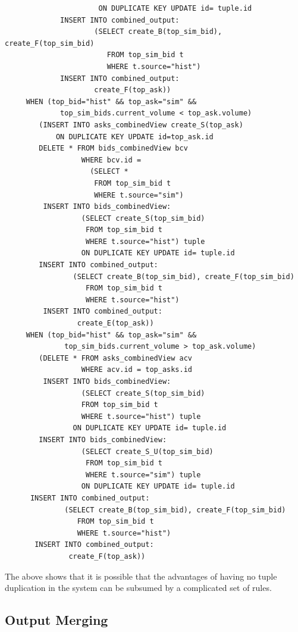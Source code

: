 \documentclass{article}
\begin{document}
\begin{verbatim}
                      ON DUPLICATE KEY UPDATE id= tuple.id
             INSERT INTO combined_output:
                     (SELECT create_B(top_sim_bid), create_F(top_sim_bid)
                        FROM top_sim_bid t
                        WHERE t.source="hist")
             INSERT INTO combined_output:
                     create_F(top_ask))
     WHEN (top_bid="hist" && top_ask="sim" &&
             top_sim_bids.current_volume < top_ask.volume)
        (INSERT INTO asks_combinedView create_S(top_ask)
            ON DUPLICATE KEY UPDATE id=top_ask.id
        DELETE * FROM bids_combinedView bcv
                  WHERE bcv.id = 
                    (SELECT *
                     FROM top_sim_bid t
                     WHERE t.source="sim")
         INSERT INTO bids_combinedView: 
                  (SELECT create_S(top_sim_bid)
                   FROM top_sim_bid t
                   WHERE t.source="hist") tuple
                  ON DUPLICATE KEY UPDATE id= tuple.id
        INSERT INTO combined_output:
                (SELECT create_B(top_sim_bid), create_F(top_sim_bid)
                   FROM top_sim_bid t
                   WHERE t.source="hist")
         INSERT INTO combined_output:
                 create_E(top_ask))
     WHEN (top_bid="hist" && top_ask="sim" &&
              top_sim_bids.current_volume > top_ask.volume)              
        (DELETE * FROM asks_combinedView acv
                  WHERE acv.id = top_asks.id
         INSERT INTO bids_combinedView: 
                  (SELECT create_S(top_sim_bid)
                  FROM top_sim_bid t
                  WHERE t.source="hist") tuple
                ON DUPLICATE KEY UPDATE id= tuple.id
        INSERT INTO bids_combinedView: 
                  (SELECT create_S_U(top_sim_bid)
                   FROM top_sim_bid t
                   WHERE t.source="sim") tuple
                  ON DUPLICATE KEY UPDATE id= tuple.id
      INSERT INTO combined_output:
              (SELECT create_B(top_sim_bid), create_F(top_sim_bid)
                 FROM top_sim_bid t
                 WHERE t.source="hist")
       INSERT INTO combined_output:
               create_F(top_ask))      
\end{verbatim}

\noindent The above shows that it is possible that the advantages of having no tuple duplication in the system can be subsumed by a complicated set of rules.

\subsection{Output Merging}
\end{document}
